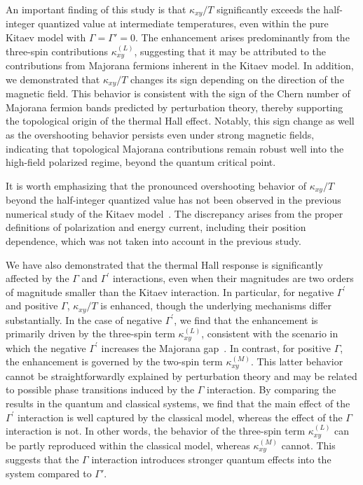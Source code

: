 \documentclass[twocolumn,superscriptaddress,showpacs, longbibliography, aps, prx]{revtex4-2}
\begin{document}
An important finding of this study is that $\kappa_{xy}/T$ significantly exceeds the half-integer quantized value at intermediate temperatures, even within the pure Kitaev model with $\Gamma=\Gamma'=0$. 
The enhancement arises predominantly from the three-spin contributions $\kappa_{xy}^{(L)}$, suggesting that it may be attributed to the contributions from Majorana fermions inherent in the Kitaev model. 
In addition, we demonstrated that $\kappa_{xy}/T$ changes its sign depending on the direction of the magnetic field. 
This behavior is consistent with the sign of the Chern number of Majorana fermion bands predicted by perturbation theory, thereby supporting the topological origin of the thermal Hall effect. 
Notably, this sign change as well as the overshooting behavior persists even under strong magnetic fields, indicating that topological Majorana contributions remain robust well into the high-field polarized regime, beyond the quantum critical point. 

It is worth emphasizing that the pronounced overshooting behavior of $\kappa_{xy}/T$ beyond the half-integer quantized value has not been observed in the previous numerical study of the Kitaev model~\cite{KumarT2023}. 
The discrepancy arises from the proper definitions of polarization and energy current, including their position dependence, which was not taken into account in the previous study. 

We have also demonstrated that the thermal Hall response is significantly affected by 
the $\Gamma$ and $\Gamma^{\prime}$ interactions, even when their magnitudes are two orders of magnitude smaller than the Kitaev interaction. 
In particular, for negative $\Gamma^{\prime}$ and positive $\Gamma$, $\kappa_{xy}/T$ is enhanced, though the underlying mechanisms differ substantially.
In the case of negative $\Gamma^{\prime}$, we find that the enhancement is primarily driven by the three-spin term $\kappa_{xy}^{(L)}$, consistent with the scenario in which the negative $\Gamma^{\prime}$ increases the Majorana gap~\cite{TakikawaF2020}.
In contrast, for positive $\Gamma$, the enhancement is governed by the two-spin term $\kappa_{xy}^{(M)}$.
This latter behavior cannot be straightforwardly explained by perturbation theory and may be related to possible phase transitions induced by the $\Gamma$ interaction.
By comparing the results in the quantum and classical systems, we find that the main effect of the $\Gamma^{\prime}$ interaction is well captured by the classical model, 
whereas the effect of the $\Gamma$ interaction is not.
In other words, the behavior of the three-spin term $\kappa_{xy}^{(L)}$ 
can be partly reproduced within the classical model, whereas $\kappa_{xy}^{(M)}$ cannot.
This suggests that the $\Gamma$ interaction introduces stronger quantum effects into the system compared to $\Gamma'$.
\end{document}
